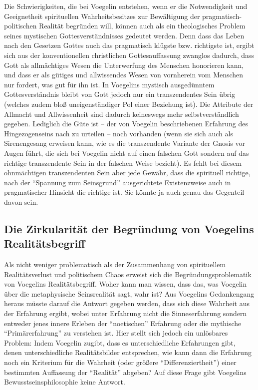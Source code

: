 Die Schwierigkeiten, die bei Voegelin entstehen, wenn er die Notwendigkeit und
Geeignetheit spirituellen Wahrheitsbesitzes zur Bewältigung der
pragmatisch-politischen Realität begründen will, können auch als ein
theologisches Problem seines mystischen Gottesverständnisses gedeutet werden.
Denn dass das Leben nach den Gesetzen Gottes auch das pragmatisch klügste bzw.
richtigste ist, ergibt sich aus der konventionellen christlichen
Gottesauffassung zwanglos dadurch, dass Gott als allmächtiges Wesen die
Unterwerfung des Menschen honorieren kann, und dass er als gütiges und
allwissendes Wesen von vornherein vom Menschen nur fordert, was gut für ihn
ist. In Voegelins mystisch ausgedünntem Gottesverständnis bleibt von Gott
jedoch nur ein transzendentes Sein übrig (welches zudem bloß uneigenständiger
Pol einer Beziehung ist). Die Attribute der Allmacht und Allwissenheit
sind dadurch keineswegs mehr selbstverständlich gegeben. Lediglich
die Güte ist -- der von Voegelin beschriebenen Erfahrung des Hingezogenseins
nach zu urteilen -- noch vorhanden (wenn sie sich auch als Sirenengesang
erweisen kann, wie es die transzendente Variante der Gnosis vor Augen führt,
die sich bei Voegelin nicht auf einen falschen Gott sondern auf das richtige
transzendente Sein in der falschen Weise bezieht). Es fehlt bei diesem
ohnmächtigen transzendenten Sein aber jede Gewähr, dass die spirituell
richtige, nach der "`Spannung zum Seinsgrund"' ausgerichtete Existenzweise
auch in pragmatischer Hinsicht die richtige ist. Sie könnte ja auch genau das
Gegenteil davon sein.

\subsection{Die Zirkularität der Begründung von Voegelins Realitätsbegriff}

Als nicht weniger problematisch als der Zusammenhang von spirituellem
Realitätsverlust und politischem Chaos erweist sich die Begründungsproblematik
von Voegelins Realitätsbegriff. Woher kann man wissen, dass das, was Voegelin
über die metaphysische Seinsrealität sagt, wahr ist? Aus Voegelins
Gedankengang heraus müsste darauf die Antwort gegeben werden, dass sich diese
Wahrheit aus der Erfahrung ergibt, wobei unter Erfahrung nicht die
Sinneserfahrung sondern entweder jenes innere Erleben der "`noetischen"'
Erfahrung oder die mythische "`Primärerfahrung"' zu verstehen ist. Hier stellt
sich jedoch ein unlösbares Problem: Indem Voegelin zugibt, dass es
unterschiedliche Erfahrungen gibt, denen unterschiedliche Realitätsbilder
entsprechen, wie kann dann die Erfahrung noch ein Kriterium für die Wahrheit
(oder größere "`Differenziertheit"') einer bestimmten Auf\/fassung der
"`Realität"' abgeben? Auf diese Frage gibt Voegelins Bewusstseinsphilosophie
keine Antwort.  

